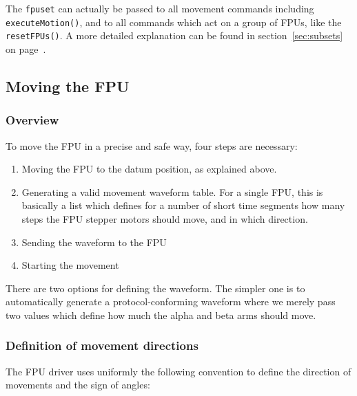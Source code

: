 \documentclass[11pt,a4paper]{scrartcl}
\begin{document}
The \texttt{fpuset} can actually be passed to all movement commands
including \texttt{executeMotion()}, and to all commands which act on a
group of FPUs, like the \texttt{resetFPUs()}. A more detailed
explanation can be found in section~\ref{sec:subsets} on
page~\pageref{sec:subsets}.


\subsection{Moving the FPU}
\subsubsection{Overview}
To move the FPU in a precise and safe way, four steps are necessary:

\begin{enumerate}
\item Moving the FPU to the datum position, as explained above.

\item Generating a valid movement waveform table. For a single FPU,
  this is basically a list which defines for a number of short time
  segments how many steps the FPU stepper motors should move, and in
  which direction.

\item Sending the waveform to the FPU
\item Starting the movement
  
\end{enumerate}

There are two options for defining the waveform. The simpler one is to
automatically generate a protocol-conforming waveform where we merely
pass two values which define how much the alpha and beta arms should
move.

\subsubsection{Definition of movement directions}

The FPU driver uses uniformly the following convention
to define the direction of movements and the sign of
angles:
\end{document}
